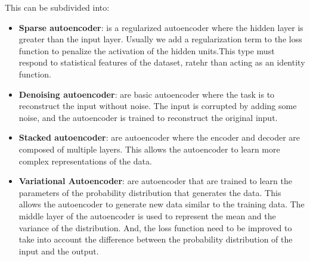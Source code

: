 This can be subdivided into:
\begin{itemize}
    \item \textbf{Sparse autoencoder}: is a regularized autoencoder where the
          hidden layer is greater than the input layer. Usually we add a
          regularization term to the loss function to penalize the activation
          of the hidden units.This type must respond to statistical features of
          the dataset, ratehr than acting as an identity function.
    \item \textbf{Denoising autoencoder}: are basic autoencoder where the task
          is to reconstruct the input without noise. The input is corrupted by
          adding some noise, and the autoencoder is trained to reconstruct the
          original input.
    \item \textbf{Stacked autoencoder}: are autoencoder where the encoder and
          decoder are composed of multiple layers. This allows the autoencoder
          to learn more complex representations of the data.
    \item \textbf{Variational Autoencoder}: are autoencoder that are trained to
          learn the parameters of the probability distribution that generates
          the data. This allows the autoencoder to generate new data similar to
          the training data. The middle layer of the autoencoder is used to
          represent the mean and the variance of the distribution. And, the loss
          function need to be improved to take into account the difference between
          the probability distribution of the input and the output.
\end{itemize}